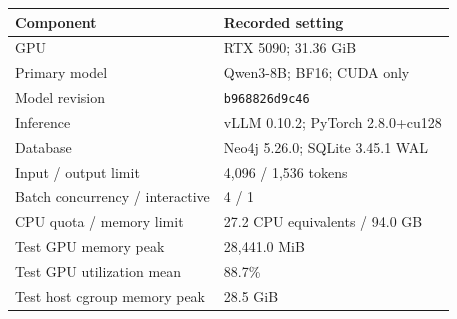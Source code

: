\begin{tabular}{ll}
\toprule
Component & Recorded setting \\
\midrule
GPU & RTX 5090; 31.36 GiB \\
Primary model & Qwen3-8B; BF16; CUDA only \\
Model revision & \texttt{b968826d9c46} \\
Inference & vLLM 0.10.2; PyTorch 2.8.0+cu128 \\
Database & Neo4j 5.26.0; SQLite 3.45.1 WAL \\
Input / output limit & 4,096 / 1,536 tokens \\
Batch concurrency / interactive & 4 / 1 \\
CPU quota / memory limit & 27.2 CPU equivalents / 94.0 GB \\
Test GPU memory peak & 28,441.0 MiB \\
Test GPU utilization mean & 88.7\% \\
Test host cgroup memory peak & 28.5 GiB \\
\bottomrule
\end{tabular}
